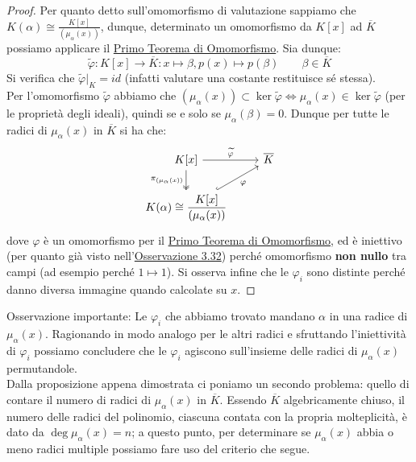 \documentclass[11pt]{scrartcl}
\begin{document}
\begin{proof}
    Per quanto detto sull'omomorfismo di valutazione sappiamo che $\displaystyle K(\alpha) \cong \frac{K[x]}{(\mu_\alpha(x))}$, 
    dunque, determinato un omomorfismo da $K[x]$ ad $\overline K$ possiamo applicare il \hyperref[omo]{Primo Teorema di Omomorfismo}. Sia dunque:
    \[ \widetilde{\varphi} : K[x] \longrightarrow \overline K : x \longmapsto \beta , p(x) \longmapsto p(\beta) \qquad \beta \in \overline K
        \]
    Si verifica che $\widetilde{\varphi}|_{K} = id$ (infatti valutare una costante restituisce sé stessa). \\
    Per l'omomorfismo $\widetilde{\varphi}$ abbiamo che $(\mu_\alpha(x)) \subset \ker \widetilde{\varphi} \iff \mu_\alpha(x) \in \ker \widetilde{\varphi}$ (per le proprietà degli ideali), quindi se e solo se $\mu_\alpha(\beta) = 0$.
    Dunque per tutte le radici di $\mu_\alpha(x)$ in $\overline K$ si ha che:
    \[\begin{tikzcd}
		K[x] \arrow[d, "\pi_{(\mu_\alpha(x))}" left, twoheadrightarrow] \arrow[r, "\widetilde{\varphi}"] & \overline K \\	
		\displaystyle K(\alpha) \cong \frac{K[x]}{(\mu_\alpha(x))} \arrow[ur, "\varphi"', hookrightarrow] & 
	\end{tikzcd}
        \]
    dove $\varphi$ è un omomorfismo per il \hyperref[omo]{Primo Teorema di Omomorfismo}, ed è iniettivo (per quanto già visto nell'\hyperref[3.32]{Osservazione 3.32}) perché omomorfismo \textbf{non nullo} tra campi (ad esempio perché $1 \longmapsto 1$). Si osserva infine che 
    le $\varphi_i$ sono distinte perché danno diversa immagine quando calcolate su $x$.
\end{proof}

Osservazione importante: 
Le $\varphi_i$ che abbiamo trovato mandano $\alpha$ in una radice di $\mu_\alpha(x)$. 
Ragionando in modo analogo per le altri radici e sfruttando l'iniettività di $\varphi_i$ possiamo concludere che le $\varphi_i$ agiscono sull'insieme delle radici di $\mu_\alpha(x)$ permutandole. \\

Dalla proposizione appena dimostrata ci poniamo un secondo problema: quello di contare il numero di radici di $\mu_\alpha (x)$ in $\overline K$. 
Essendo $\overline K$ algebricamente chiuso, il numero delle radici del polinomio, ciascuna contata con la propria molteplicità, è dato da $\deg \mu_\alpha(x) = n$; 
a questo punto, per determinare se $\mu_\alpha(x)$ abbia o meno radici multiple possiamo fare uso del criterio che segue.
\end{document}
